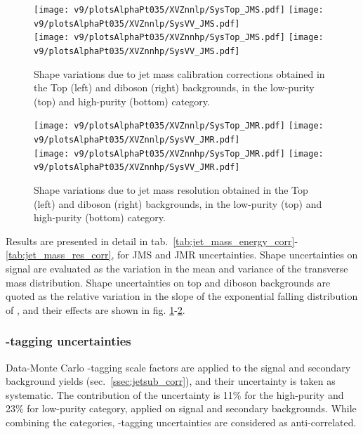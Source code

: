  \begin{figure}[!htb]
   \begin{center}
     \texttt{[image: v9/plotsAlphaPt035/XVZnnlp/SysTop\_JMS.pdf]}
     \texttt{[image: v9/plotsAlphaPt035/XVZnnlp/SysVV\_JMS.pdf]}
     \\
     \texttt{[image: v9/plotsAlphaPt035/XVZnnhp/SysTop\_JMS.pdf]}
     \texttt{[image: v9/plotsAlphaPt035/XVZnnhp/SysVV\_JMS.pdf]}

   \end{center}
   \caption{Shape variations due to jet mass calibration corrections obtained in the Top (left) and diboson (right) backgrounds, in the low-purity (top) and high-purity (bottom) category.}
   \label{fig:sysJMS}
 \end{figure}

 \begin{figure}[!htb]
   \begin{center}
     \texttt{[image: v9/plotsAlphaPt035/XVZnnlp/SysTop\_JMR.pdf]}
     \texttt{[image: v9/plotsAlphaPt035/XVZnnlp/SysVV\_JMR.pdf]}
     \\
     \texttt{[image: v9/plotsAlphaPt035/XVZnnhp/SysTop\_JMR.pdf]}
     \texttt{[image: v9/plotsAlphaPt035/XVZnnhp/SysVV\_JMR.pdf]}

   \end{center}
   \caption{Shape variations due to jet mass resolution obtained in the Top (left) and diboson (right) backgrounds, in the low-purity (top) and high-purity (bottom) category.}
   \label{fig:sysJMR}
 \end{figure}

\noindent Results are presented in detail in tab.~\ref{tab:jet_mass_energy_corr}-\ref{tab:jet_mass_res_corr}, for JMS and JMR uncertainties. Shape uncertainties on signal are evaluated as the variation in the mean and variance of the transverse mass distribution. Shape uncertainties on top and diboson backgrounds are quoted as the relative variation in the slope of the exponential falling distribution of \mtVZ, and their effects are shown in fig. \ref{fig:sysJMS}-\ref{fig:sysJMR}.


\subsubsection{\V-tagging uncertainties}
\label{sec:wtagunc}

Data-Monte Carlo \V-tagging scale factors are applied to the signal and secondary background yields (sec.~\ref{ssec:jetsub_corr}), and their uncertainty is taken as systematic. The contribution of the uncertainty is 11\% for the high-purity and 23\% for low-purity category, applied on signal and secondary backgrounds. While combining the categories, \V-tagging uncertainties are considered as anti-correlated.

